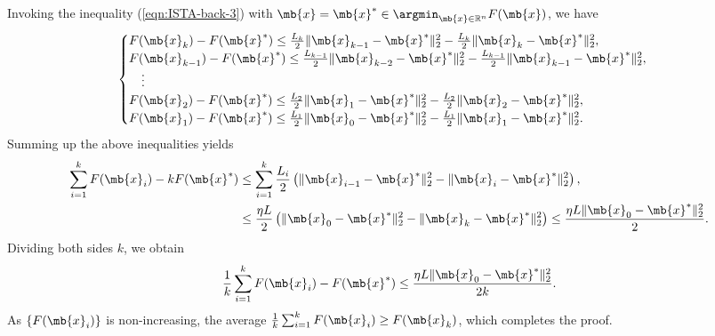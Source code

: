 \begin{exercise}
\begin{enumerate}
            \begin{solution}
                Invoking the inequality (\ref{eqn:ISTA-back-3}) with $\mb{x} = \mb{x}^*\in \argmin_{\mb{x}\in\mathbb{R}^n} F(\mb{x})$, we have
                \begin{align*}
                    \begin{cases}
                        F(\mb{x}_k) - F(\mb{x}^*) \le \frac{L_k}{2}\|\mb{x}_{k-1} - \mb{x}^*\|_2^2 - \frac{L_k}{2}\|\mb{x}_{k} - \mb{x}^*\|_2^2,               \\
                        F(\mb{x}_{k-1}) - F(\mb{x}^*) \le \frac{L_{k-1}}{2}\|\mb{x}_{k-2} - \mb{x}^*\|_2^2 - \frac{L_{k-1}}{2}\|\mb{x}_{k-1} - \mb{x}^*\|_2^2, \\
                        \quad \vdots                                                                                                                           \\
                        F(\mb{x}_2) - F(\mb{x}^*) \le \frac{L_2}{2}\|\mb{x}_1 - \mb{x}^*\|_2^2 - \frac{L_2}{2}\|\mb{x}_2 - \mb{x}^*\|_2^2,                     \\
                        F(\mb{x}_1) - F(\mb{x}^*) \le \frac{L_1}{2}\|\mb{x}_0 - \mb{x}^*\|_2^2 - \frac{L_1}{2}\|\mb{x}_1 - \mb{x}^*\|_2^2.                     \\
                    \end{cases}
                \end{align*}
                Summing up the above inequalities yields
                \begin{align*}
                    \sum_{i=1}^k F(\mb{x}_i) - kF(\mb{x}^*) & \le \sum_{i=1}^k \frac{L_i}{2}\left(\|\mb{x}_{i-1}- \mb{x}^*\|_2^2 - \|\mb{x}_i - \mb{x}^*\|_2^2\right),                                     \\
                                                            & \le \frac{\eta L}{2} \left(\|\mb{x}_0 - \mb{x}^*\|_2^2 - \|\mb{x}_k - \mb{x}^*\|_2^2\right) \le \frac{\eta L\|\mb{x}_0 - \mb{x}^*\|_2^2}{2}.
                \end{align*}
                Dividing both sides $k$, we obtain
                \begin{align*}
                    \frac{1}{k}\sum_{i=1}^k F(\mb{x}_i) - F(\mb{x}^*) \le \frac{\eta L\|\mb{x}_0 - \mb{x}^*\|_2^2}{2k}.
                \end{align*}
                As $\{F(\mb{x}_i)\}$ is non-increasing, the average $\frac{1}{k}\sum_{i=1}^k F(\mb{x}_i) \ge F(\mb{x}_k)$, which completes the proof.


\end{solution}
\end{enumerate}
\end{exercise}
